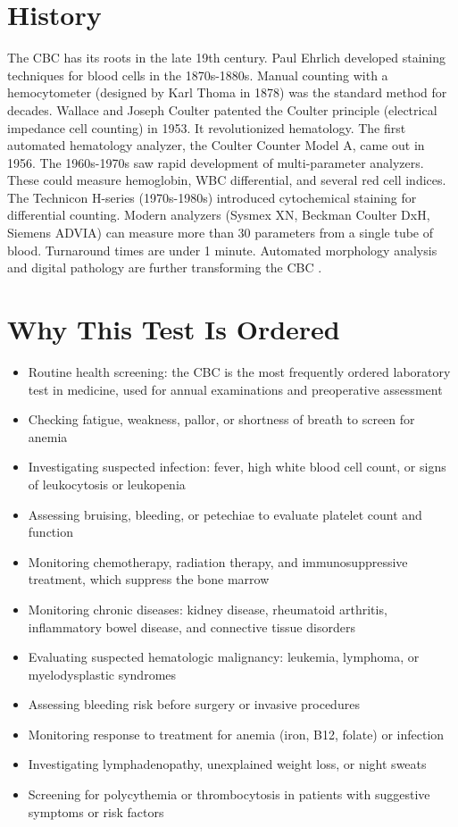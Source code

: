 \section*{History}
The CBC has its roots in the late 19th century. Paul Ehrlich developed staining techniques for blood cells in the 1870s-1880s. Manual counting with a hemocytometer (designed by Karl Thoma in 1878) was the standard method for decades. Wallace and Joseph Coulter patented the Coulter principle (electrical impedance cell counting) in 1953. It revolutionized hematology. The first automated hematology analyzer, the Coulter Counter Model A, came out in 1956. The 1960s-1970s saw rapid development of multi-parameter analyzers. These could measure hemoglobin, WBC differential, and several red cell indices. The Technicon H-series (1970s-1980s) introduced cytochemical staining for differential counting. Modern analyzers (Sysmex XN, Beckman Coulter DxH, Siemens ADVIA) can measure more than 30 parameters from a single tube of blood. Turnaround times are under 1 minute. Automated morphology analysis and digital pathology are further transforming the CBC \cite{tietz2023textbook}.

\section*{Why This Test Is Ordered}
\begin{itemize}
  \item Routine health screening: the CBC is the most frequently ordered laboratory test in medicine, used for annual examinations and preoperative assessment
  \item Checking fatigue, weakness, pallor, or shortness of breath to screen for anemia
  \item Investigating suspected infection: fever, high white blood cell count, or signs of leukocytosis or leukopenia
  \item Assessing bruising, bleeding, or petechiae to evaluate platelet count and function
  \item Monitoring chemotherapy, radiation therapy, and immunosuppressive treatment, which suppress the bone marrow
  \item Monitoring chronic diseases: kidney disease, rheumatoid arthritis, inflammatory bowel disease, and connective tissue disorders
  \item Evaluating suspected hematologic malignancy: leukemia, lymphoma, or myelodysplastic syndromes
  \item Assessing bleeding risk before surgery or invasive procedures
  \item Monitoring response to treatment for anemia (iron, B12, folate) or infection
  \item Investigating lymphadenopathy, unexplained weight loss, or night sweats
  \item Screening for polycythemia or thrombocytosis in patients with suggestive symptoms or risk factors
\end{itemize}

